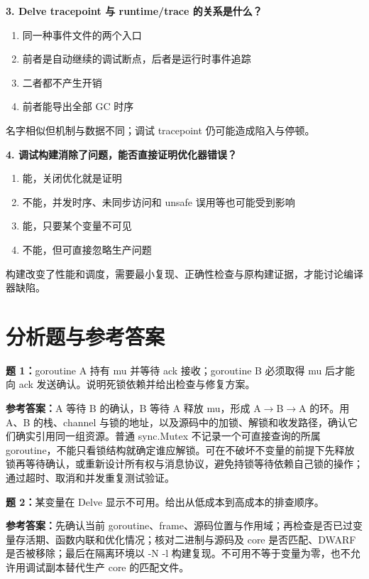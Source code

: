 \documentclass[UTF8,fontset=fandol,openany,11pt]{ctexbook}
\begin{document}
\noindent\textbf{3. Delve tracepoint 与 runtime/trace 的关系是什么？}
\begin{enumerate}[label=\Alph*.]
\item 同一种事件文件的两个入口
\item 前者是自动继续的调试断点，后者是运行时事件追踪
\item 二者都不产生开销
\item 前者能导出全部 GC 时序
\end{enumerate}
名字相似但机制与数据不同；调试 tracepoint 仍可能造成陷入与停顿。

\noindent\textbf{4. 调试构建消除了问题，能否直接证明优化器错误？}
\begin{enumerate}[label=\Alph*.]
\item 能，关闭优化就是证明
\item 不能，并发时序、未同步访问和 unsafe 误用等也可能受到影响
\item 能，只要某个变量不可见
\item 不能，但可直接忽略生产问题
\end{enumerate}
构建改变了性能和调度，需要最小复现、正确性检查与原构建证据，才能讨论编译器缺陷。

\section{分析题与参考答案}
\noindent\textbf{题 1：}goroutine A 持有 mu 并等待 ack 接收；goroutine B 必须取得 mu 后才能向 ack 发送确认。说明死锁依赖并给出检查与修复方案。

\noindent\textbf{参考答案：}A 等待 B 的确认，B 等待 A 释放 mu，形成 A\ensuremath{\rightarrow}\allowbreak{}B\ensuremath{\rightarrow}\allowbreak{}A 的环。用 A、B 的栈、channel 与锁的地址，以及源码中的加锁、解锁和收发路径，确认它们确实引用同一组资源。普通 sync.Mutex 不记录一个可直接查询的所属 goroutine，不能只看锁结构就确定谁应解锁。可在不破坏不变量的前提下先释放锁再等待确认，或重新设计所有权与消息协议，避免持锁等待依赖自己锁的操作；通过超时、取消和并发重复测试验证。

\noindent\textbf{题 2：}某变量在 Delve 显示不可用。给出从低成本到高成本的排查顺序。

\noindent\textbf{参考答案：}先确认当前 goroutine、frame、源码位置与作用域；再检查是否已过变量存活期、函数内联和优化情况；核对二进制与源码及 core 是否匹配、DWARF 是否被移除；最后在隔离环境以 -N -l 构建复现。不可用不等于变量为零，也不允许用调试副本替代生产 core 的匹配文件。
\end{document}
